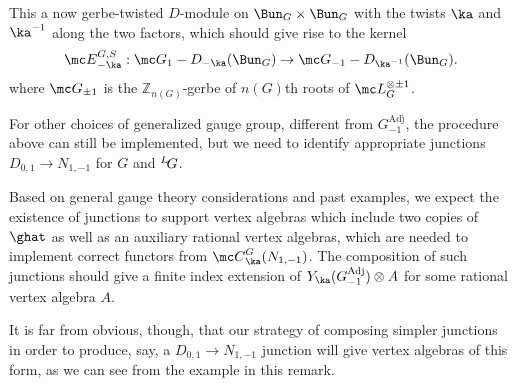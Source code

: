 \documentclass[11pt,reqno]{amsart}
\theoremstyle{plain}
\numberwithin{equation}{section}
\newcommand{\Z}{\mathbb{Z}}
\def\neg{\negthinspace}
\def\LG{{}^L\neg G}
\theoremstyle{definition}
\begin{document}
This a now gerbe-twisted $D$-module on $\Bun_G \times \Bun_G$ with the
twists $\ka$ and $\ka^{-1}$ along the two factors, which should give
rise to the kernel
$$
{\mc E}^{G,S}_{-\ka}: {\mc G}_{1}-D_{-\ka}(\Bun_G) \to {\mc
  G}_{-1}-D_{\ka^{-1}}(\Bun_G).
$$
where ${\mc G}_{\pm 1}$ is the $\Z_{n(G)}$-gerbe of $n(G)$th roots of
${\mc L}_G^{\otimes \pm 1}$.

For other choices of generalized gauge group, different from
$G^{\mathrm{Adj}}_{-1}$, the procedure above can still be implemented,
but we need to identify appropriate junctions $D_{0,1} \to N_{1,-1}$
for $G$ and $\LG$.

Based on general gauge theory considerations and past examples, we
expect the existence of junctions to support vertex algebras which
include two copies of $\ghat$ as well as an auxiliary rational vertex
algebras, which are needed to implement correct functors from ${\mc
  C}^G_\ka(N_{1,-1})$.  The composition of such junctions should give
a finite index extension of $Y_\ka(G^{\mathrm{Adj}}_{-1}) \otimes A$
for some rational vertex algebra $A$.

It is far from obvious, though, that our strategy of composing simpler
junctions in order to produce, say, a $D_{0,1} \to N_{1,-1}$ junction
will give vertex algebras of this form, as we can see from the example
in this remark.
\end{document}
